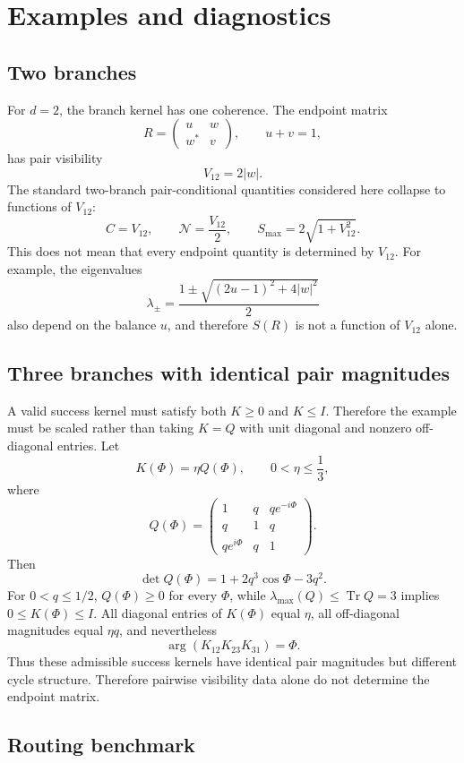 \documentclass[reprint,aps,pra,superscriptaddress,nofootinbib,longbibliography]{revtex4-2}
\newcommand{\Tr}{\operatorname{Tr}}
\newcommand{\N}{\mathcal N}
\begin{document}
\section{Examples and diagnostics}
\label{sec:examples}

\subsection{Two branches}

For \(d=2\), the branch kernel has one coherence.  The endpoint matrix
\[
R=
\begin{pmatrix}
u&w\\
w^*&v
\end{pmatrix},
\qquad u+v=1,
\]
has pair visibility
\[
V_{12}=2|w|.
\]
The standard two-branch pair-conditional quantities considered here collapse to functions of \(V_{12}\):
\[
C=V_{12},\qquad
\N=\frac{V_{12}}2,\qquad
S_{\max}=2\sqrt{1+V_{12}^2}.
\]
This does not mean that every endpoint quantity is determined by \(V_{12}\).  For example, the eigenvalues
\[
\lambda_\pm=
\frac{1\pm\sqrt{(2u-1)^2+4|w|^2}}2
\]
also depend on the balance \(u\), and therefore \(S(R)\) is not a function of \(V_{12}\) alone.

\subsection{Three branches with identical pair magnitudes}

A valid success kernel must satisfy both \(K\ge0\) and \(K\le I\).  Therefore the example must be scaled rather than taking \(K=Q\) with unit diagonal and nonzero off-diagonal entries.  Let
\[
K(\Phi)=\eta Q(\Phi),
\qquad
0<\eta\le\frac13,
\]
where
\[
Q(\Phi)=
\begin{pmatrix}
1&q&q e^{-i\Phi}\\
q&1&q\\
q e^{i\Phi}&q&1
\end{pmatrix}.
\]
Then
\[
\det Q(\Phi)
=
1+2q^3\cos\Phi-3q^2.
\]
For \(0<q\le1/2\), \(Q(\Phi)\ge0\) for every \(\Phi\), while \(\lambda_{\max}(Q)\le\Tr Q=3\) implies \(0\le K(\Phi)\le I\).  All diagonal entries of \(K(\Phi)\) equal \(\eta\), all off-diagonal magnitudes equal \(\eta q\), and nevertheless
\[
\arg(K_{12}K_{23}K_{31})=\Phi .
\]
Thus these admissible success kernels have identical pair magnitudes but different cycle structure.  Therefore pairwise visibility data alone do not determine the endpoint matrix.

\subsection{Routing benchmark}
\end{document}
